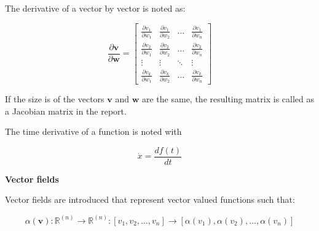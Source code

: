 The derivative of a vector by vector is noted as:

\begin{equation}
\frac{\partial{\bm{v}}}{\partial{\bm{w}}} =
\begin{bmatrix}
    \frac{\partial v_{1}}{\partial w_1} & \frac{\partial v_{1}}{\partial w_2} &  \dots  & \frac{\partial v_{1}}{\partial w_n} \\
    \frac{\partial v_{2}}{\partial w_1} & \frac{\partial v_{2}}{\partial w_2} &  \dots  & \frac{\partial v_{2}}{\partial w_n} \\
    \vdots & \vdots &  \ddots & \vdots \\
    \frac{\partial v_{k}}{\partial w_1} & \frac{\partial v_{k}}{\partial w_2} &  \dots  & \frac{\partial v_{k}}{\partial w_n}
\end{bmatrix}
\end{equation}

If the size is of the vectors $\bm{v}$ and $\bm{w}$ are the same, the resulting matrix is called as a Jacobian matrix in the report.

The time derivative of a function is noted with

\begin{equation}
\dot{x} = \frac{d f(t)}{dt}
\end{equation}

\textbf{Vector fields}

Vector fields are introduced that represent vector valued functions such that:

\begin{equation}
\alpha(\bm{v}) : \pmb{{\mathbb{R}}}^{(n)} \rightarrow \pmb{{\mathbb{R}}}^{(n)} : [v_1, v_2, \hdots, v_n] \rightarrow [\alpha(v_1), \alpha(v_2),\hdots,\alpha(v_n)]
\end{equation}



